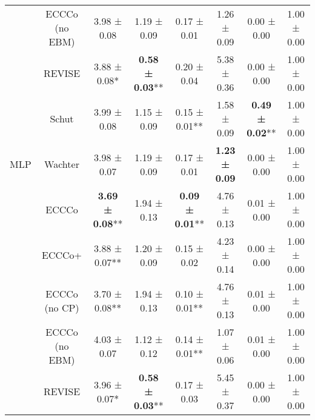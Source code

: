 \begin{table}
{\begin{tabular}[t]{cccccccc}
 & ECCCo (no EBM) & 3.98 ± 0.08\hphantom{*}\hphantom{*} & 1.19 ± 0.09\hphantom{*}\hphantom{*} & 0.17 ± 0.01\hphantom{*}\hphantom{*} & 1.26 ± 0.09\hphantom{*}\hphantom{*} & 0.00 ± 0.00\hphantom{*}\hphantom{*} & 1.00 ± 0.00\hphantom{*}\hphantom{*}\\

 & REVISE & 3.88 ± 0.08*\hphantom{*} & \textbf{0.58 ± 0.03}** & 0.20 ± 0.04\hphantom{*}\hphantom{*} & 5.38 ± 0.36\hphantom{*}\hphantom{*} & 0.00 ± 0.00\hphantom{*}\hphantom{*} & 1.00 ± 0.00\hphantom{*}\hphantom{*}\\

 & Schut & 3.99 ± 0.08\hphantom{*}\hphantom{*} & 1.15 ± 0.09\hphantom{*}\hphantom{*} & 0.15 ± 0.01** & 1.58 ± 0.09\hphantom{*}\hphantom{*} & \textbf{0.49 ± 0.02}** & 1.00 ± 0.00\hphantom{*}\hphantom{*}\\

\multirow[t]{-7}{*}{\centering\arraybackslash MLP} & Wachter & 3.98 ± 0.07\hphantom{*}\hphantom{*} & 1.19 ± 0.09\hphantom{*}\hphantom{*} & 0.17 ± 0.01\hphantom{*}\hphantom{*} & \textbf{1.23 ± 0.09}\hphantom{*}\hphantom{*} & 0.00 ± 0.00\hphantom{*}\hphantom{*} & 1.00 ± 0.00\hphantom{*}\hphantom{*}\\
\cmidrule{1-8}
 & ECCCo & \textbf{3.69 ± 0.08}** & 1.94 ± 0.13\hphantom{*}\hphantom{*} & \textbf{0.09 ± 0.01}** & 4.76 ± 0.13\hphantom{*}\hphantom{*} & 0.01 ± 0.00\hphantom{*}\hphantom{*} & 1.00 ± 0.00\hphantom{*}\hphantom{*}\\

 & ECCCo+ & 3.88 ± 0.07** & 1.20 ± 0.09\hphantom{*}\hphantom{*} & 0.15 ± 0.02\hphantom{*}\hphantom{*} & 4.23 ± 0.14\hphantom{*}\hphantom{*} & 0.00 ± 0.00\hphantom{*}\hphantom{*} & 1.00 ± 0.00\hphantom{*}\hphantom{*}\\

 & ECCCo (no CP) & 3.70 ± 0.08** & 1.94 ± 0.13\hphantom{*}\hphantom{*} & 0.10 ± 0.01** & 4.76 ± 0.13\hphantom{*}\hphantom{*} & 0.01 ± 0.00\hphantom{*}\hphantom{*} & 1.00 ± 0.00\hphantom{*}\hphantom{*}\\

 & ECCCo (no EBM) & 4.03 ± 0.07\hphantom{*}\hphantom{*} & 1.12 ± 0.12\hphantom{*}\hphantom{*} & 0.14 ± 0.01** & 1.07 ± 0.06\hphantom{*}\hphantom{*} & 0.01 ± 0.00\hphantom{*}\hphantom{*} & 1.00 ± 0.00\hphantom{*}\hphantom{*}\\

 & REVISE & 3.96 ± 0.07*\hphantom{*} & \textbf{0.58 ± 0.03}** & 0.17 ± 0.03\hphantom{*}\hphantom{*} & 5.45 ± 0.37\hphantom{*}\hphantom{*} & 0.00 ± 0.00\hphantom{*}\hphantom{*} & 1.00 ± 0.00\hphantom{*}\hphantom{*}\\


\end{tabular}}
\end{table}
